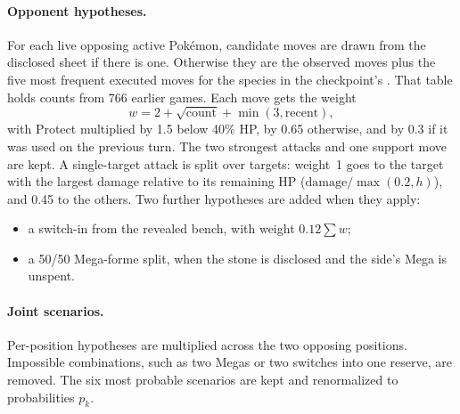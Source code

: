 \paragraph{Opponent hypotheses.}
For each live opposing active Pok\'{e}mon, candidate moves are drawn from the
disclosed sheet if there is one. Otherwise they are the observed moves plus
the five most frequent executed moves for the species in the checkpoint's
. That table holds counts from 766 earlier games.
Each move gets the weight
\begin{equation}
  w=2+\sqrt{\text{count}}+\min(3,\text{recent}),
\end{equation}
with Protect multiplied by 1.5 below 40\% HP, by 0.65 otherwise, and by 0.3
if it was used on the previous turn. The two strongest attacks and one support
move are kept. A single-target attack is split over targets: weight~1 goes to
the target with the largest damage relative to its remaining HP
($\text{damage}/\max(0.2,h)$), and 0.45 to the others. Two further hypotheses are
added when they apply:
\begin{itemize}
  \item a switch-in from the revealed bench, with weight $0.12\sum w$;
  \item a 50/50 Mega-forme split, when the stone is disclosed and the side's
    Mega is unspent.
\end{itemize}

\paragraph{Joint scenarios.}
Per-position hypotheses are multiplied across the two opposing positions.
Impossible combinations, such as two Megas or two switches into one reserve,
are removed. The six most probable scenarios are kept and renormalized to
probabilities $p_k$.

